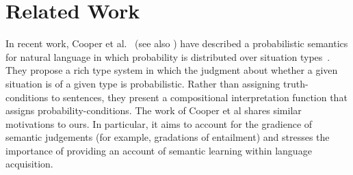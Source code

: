 \documentclass[11pt]{article}
\theoremstyle{definition}
\begin{document}



\section{Related Work}


In recent work, Cooper et al.~\cite{Cooper:14} (see also
\cite{Eijck:12}) have described a probabilistic semantics for natural language in which probability is distributed over situation types~\cite{Barwise:83}. They propose a rich type system in which the judgment about whether a given situation is of a given type is probabilistic. Rather than assigning truth-conditions to sentences, they present a compositional interpretation function that assigns probability-conditions. The work of Cooper et al shares similar motivations to ours. In particular, it aims to account for the gradience of semantic judgements (for example, gradations of entailment) and stresses the importance of providing an account of semantic learning within language acquisition.
\end{document}
